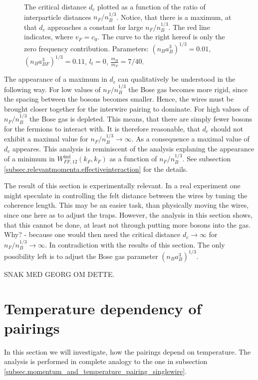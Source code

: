 \begin{figure} 
\begin{center}  
  
\caption{The critical distance $d_c$ plotted as a function of the ratio of interparticle distances $n_F/n_B^{1/3}$. Notice, that there is a maximum, at that $d_c$ approaches a constant for large $n_F/n_B^{1/3}$. The red line indicates, where $v_F = c_0$. The curve to the right hereof is only the zero frequency contribution. Parameters: $(n_Ba_B^3)^{1/3} = 0.01$, $(n_Ba_{BF}^3)^{1/3} = 0.11$, $l_t = 0$, $\frac{m_B}{m_F} = 7/40$. }  
\label{fig.twowirescrossovernBdepend}  
\end{center}    
\end{figure}

The appearance of a maximum in $d_c$ can qualitatively be understood in the following way. For low values of $n_F/n_B^{1/3}$ the Bose gas becomes more rigid, since the spacing between the bosons becomes smaller. Hence, the wires must be brought closer together for the interwire pairing to dominate. For high values of $n_F/n_B^{1/3}$ the Bose gas is depleted. This means, that there are simply fewer bosons for the fermions to interact with. It is therefore reasonable, that $d_c$ should not exhibit a maximal value for $n_F/n_B^{1/3} \to \infty$. As a consequence a maximal value of $d_c$ appeares. This analysis is reminiscent of the analysis explaning the appearance of a minimum in $W^\text{ind}_{FF,12}(k_F,k_F)$ as a function of $n_F/n_B^{1/3}$. See subsection \ref{subsec.relevantmomenta.effectiveinteraction} for the details.  

The result of this section is experimentally relevant. In a real experiment one might speculate in controlling the felt distance between the wires by tuning the coherence length. This may be an easier task, than physically moving the wires, since one here as to adjust the traps. However, the analysis in this section shows, that this cannot be done, at least not through putting more bosons into the gas. Why? - because one would then need the critical distance $d_c \to \infty$ for $n_F/n_B^{1/3} \to \infty$. In contradiction with the results of this section. The only possibility left is to adjust the Bose gas parameter $(n_Ba_B^3)^{1/3}$. 

SNAK MED GEORG OM DETTE.  

\section{Temperature dependency of pairings}
In this section we will investigate, how the pairings depend on temperature. The analysis is performed in complete analogy to the one in subsection \ref{subsec.momentum_and_temperature_pairing_singlewire}. 

